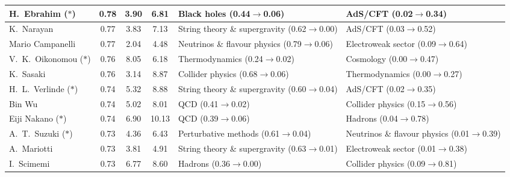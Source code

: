 \begin{table}[H]
\begin{tabular}{p{}|c|c|c|b{}|b{}}
     H.~Ebrahim ($\ast$) &  0.78 &          3.90 &          6.81 &                   Black holes (0.44$\to$0.06) &                      AdS/CFT (0.02$\to$0.34)\\ \hline
              K.~Narayan &  0.77 &          3.83 &          7.13 & String theory \& supergravity (0.62$\to$0.00) &                      AdS/CFT (0.03$\to$0.52)\\ \hline
        Mario Campanelli &  0.77 &          2.04 &          4.48 &  Neutrinos \& flavour physics (0.79$\to$0.06) &           Electroweak sector (0.09$\to$0.64)\\ \hline
V.~K.~Oikonomou ($\ast$) &  0.76 &          8.05 &          6.18 &                Thermodynamics (0.24$\to$0.02) &                    Cosmology (0.00$\to$0.47)\\ \hline
               K.~Sasaki &  0.76 &          3.14 &          8.87 &              Collider physics (0.68$\to$0.06) &               Thermodynamics (0.00$\to$0.27)\\ \hline
 H.~L.~Verlinde ($\ast$) &  0.74 &          5.32 &          8.88 & String theory \& supergravity (0.60$\to$0.04) &                      AdS/CFT (0.02$\to$0.35)\\ \hline
                  Bin Wu &  0.74 &          5.02 &          8.01 &                           QCD (0.41$\to$0.02) &             Collider physics (0.15$\to$0.56)\\ \hline
    Eiji Nakano ($\ast$) &  0.74 &          6.90 &         10.13 &                           QCD (0.39$\to$0.06) &                      Hadrons (0.04$\to$0.78)\\ \hline
   A.~T.~Suzuki ($\ast$) &  0.73 &          4.36 &          6.43 &          Perturbative methods (0.61$\to$0.04) & Neutrinos \& flavour physics (0.01$\to$0.39)\\ \hline
             A.~Mariotti &  0.73 &          3.81 &          4.91 & String theory \& supergravity (0.63$\to$0.01) &           Electroweak sector (0.01$\to$0.38)\\ \hline
              I.~Scimemi &  0.73 &          6.77 &          8.60 &                       Hadrons (0.36$\to$0.00) &             Collider physics (0.09$\to$0.81)\\ \hline
\bottomrule
\end{tabular}
\end{table}
